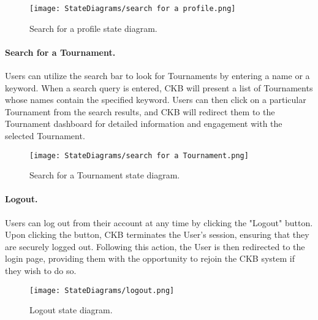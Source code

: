 \begin{figure}[H]
    \begin{center}
        \texttt{[image: StateDiagrams/search for a profile.png]}
        \caption{Search for a profile state diagram.}
        \label{fig:search_profile_sd}%
    \end{center}
\end{figure}

\paragraph{Search for a Tournament.}
Users can utilize the search bar to look for Tournaments by entering a name or a keyword. When a search query is entered, CKB will present a list of Tournaments whose names contain the specified keyword. Users can then click on a particular Tournament from the search results, and CKB will redirect them to the Tournament dashboard for detailed information and engagement with the selected Tournament. 

\begin{figure}[H]
    \begin{center}
        \texttt{[image: StateDiagrams/search for a Tournament.png]}
        \caption{Search for a Tournament state diagram.}
        \label{fig:search_Tournament_sd}%
    \end{center}
\end{figure}

\paragraph{Logout.}
Users can log out from their account at any time by clicking the "Logout" button. Upon clicking the button, CKB terminates the User's session, ensuring that they are securely logged out. Following this action, the User is then redirected to the login page, providing them with the opportunity to rejoin the CKB system if they wish to do so. 

\begin{figure}[H]
    \begin{center}
        \texttt{[image: StateDiagrams/logout.png]}
        \caption{Logout state diagram.}
        \label{fig:logout_sd}%
    \end{center}
\end{figure}

